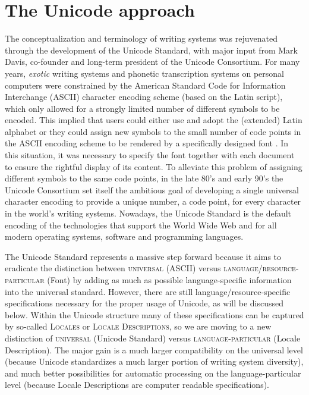 \section{The Unicode approach} \label{the-unicode-approach}

The conceptualization and terminology of writing systems was rejuvenated through
the development of the Unicode Standard, with major input from Mark Davis,
co-founder and long-term president of the Unicode Consortium. For many years,
\textit{exotic} writing systems and phonetic transcription systems on personal
computers were constrained by the American Standard Code for Information
Interchange (ASCII) character encoding scheme (based on the Latin script), which
only allowed for a strongly limited number of different symbols to be encoded.
This implied that users could either use and adopt the (extended) Latin alphabet
or they could assign new symbols to the small number of code points in the ASCII
encoding scheme to be rendered by a specifically designed font
\citep{BirdSimons2003}. In this situation, it was necessary to specify the font
together with each document to ensure the rightful display of its content. To
alleviate this problem of assigning different symbols to the same code points,
in the late 80's and early 90's the Unicode Consortium set itself the ambitious
goal of developing a single universal character encoding to provide a unique
number, a code point, for every character in the world's writing systems.
Nowadays, the Unicode Standard is the default encoding of the technologies that
support the World Wide Web and for all modern operating systems, software and
programming languages.

The Unicode Standard represents a massive step forward because it aims to
eradicate the distinction between \textsc{universal} (ASCII) versus
\textsc{language/resource-particular} (Font) by adding as much as possible
language-specific information into the universal standard. However, there are
still language/resource-specific specifications necessary for the proper usage
of Unicode, as will be discussed below. Within the Unicode structure many of
these specifications can be captured by so-called \textsc{Locales} or
\textsc{Locale Descriptions}, so we are moving to a new distinction of
\textsc{universal} (Unicode Standard) versus \textsc{language-particular}
(Locale Description). The major gain is a much larger compatibility on the
universal level (because Unicode standardizes a much larger portion of writing
system diversity), and much better possibilities for automatic processing on the
language-particular level (because Locale Descriptions are computer readable
specifications).

